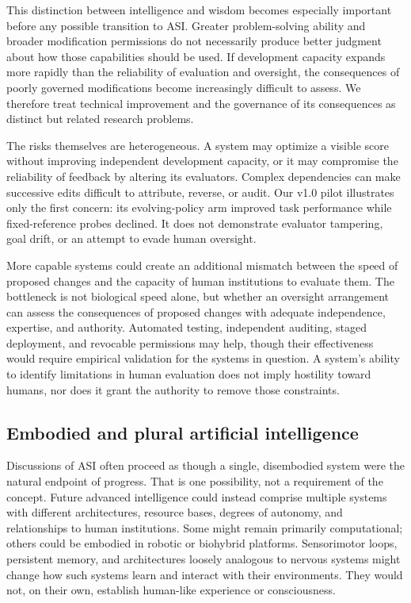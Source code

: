 \documentclass[11pt,a4paper]{article}
\begin{document}
This distinction between intelligence and wisdom becomes especially important before any possible transition to ASI. Greater problem-solving ability and broader modification permissions do not necessarily produce better judgment about how those capabilities should be used. If development capacity expands more rapidly than the reliability of evaluation and oversight, the consequences of poorly governed modifications become increasingly difficult to assess. We therefore treat technical improvement and the governance of its consequences as distinct but related research problems.

The risks themselves are heterogeneous. A system may optimize a visible score without improving independent development capacity, or it may compromise the reliability of feedback by altering its evaluators. Complex dependencies can make successive edits difficult to attribute, reverse, or audit. Our v1.0 pilot illustrates only the first concern: its evolving-policy arm improved task performance while fixed-reference probes declined. It does not demonstrate evaluator tampering, goal drift, or an attempt to evade human oversight.

More capable systems could create an additional mismatch between the speed of proposed changes and the capacity of human institutions to evaluate them. The bottleneck is not biological speed alone, but whether an oversight arrangement can assess the consequences of proposed changes with adequate independence, expertise, and authority. Automated testing, independent auditing, staged deployment, and revocable permissions may help, though their effectiveness would require empirical validation for the systems in question. A system's ability to identify limitations in human evaluation does not imply hostility toward humans, nor does it grant the authority to remove those constraints.

\subsection{Embodied and plural artificial intelligence}
Discussions of ASI often proceed as though a single, disembodied system were the natural endpoint of progress. That is one possibility, not a requirement of the concept. Future advanced intelligence could instead comprise multiple systems with different architectures, resource bases, degrees of autonomy, and relationships to human institutions. Some might remain primarily computational; others could be embodied in robotic or biohybrid platforms. Sensorimotor loops, persistent memory, and architectures loosely analogous to nervous systems might change how such systems learn and interact with their environments. They would not, on their own, establish human-like experience or consciousness.
\end{document}
